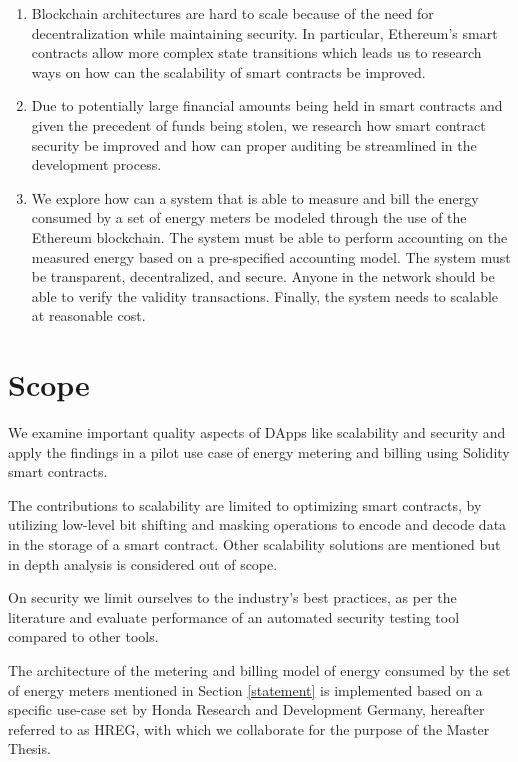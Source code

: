 \begin{enumerate}\label{statement}
    \item Blockchain architectures are hard to scale because of the need for decentralization while maintaining security. In particular, Ethereum's smart contracts allow more complex state transitions which leads us to research ways on how can the scalability of smart contracts be improved.
    \item Due to potentially large financial amounts being held in smart contracts and given the precedent of funds being stolen, we research how smart contract security be improved and how can proper auditing be streamlined in the development process.
    \item We explore how can a system that is able to measure and bill the energy consumed by a set of energy meters be modeled through the use of the Ethereum blockchain. The system must be able to perform accounting on the measured energy based on a pre-specified accounting model. The system must be transparent, decentralized, and secure. Anyone in the network should be able to verify the validity transactions. Finally, the system needs to scalable at reasonable cost.
\end{enumerate}

\section{Scope}
We examine important quality aspects of DApps like scalability and security and apply the findings in a pilot use case of energy metering and billing using Solidity smart contracts. 

The contributions to scalability are limited to optimizing smart contracts, by utilizing low-level bit shifting and masking operations to encode and decode data in the storage of a smart contract. Other scalability solutions are mentioned but in depth analysis is considered out of scope. 

On security we limit ourselves to the industry's best practices, as per the literature and evaluate performance of an automated security testing tool compared to other tools.

The architecture of the metering and billing model of energy consumed by the set of energy meters mentioned in Section \ref{statement} is implemented based on a specific use-case set by Honda Research and Development Germany, hereafter referred to as HREG, with which we collaborate for the purpose of the Master Thesis.

